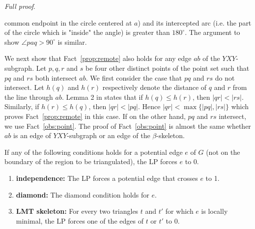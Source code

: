 \documentclass[final]{siamltex}
\newcommand{\dg}{^{\circ}}
\newcommand{\edge}{e}
\newcommand{\graph}{G}
\newcommand{\tri}{t}  \newcommand{\vertex}{v}
\newcommand{\YXY}{YXY\xspace}
\newenvironment{fullproof}{\par{\it Full proof}. \ignorespaces}{\endproof}
\begin{document}
\begin{fullproof}
\begin{window}
common endpoint in the circle centered at $a$) and its intercepted arc (i.e. the part of the circle 
which is "inside" the angle) is greater than $180\dg$. The argument to show $\angle p a q > 90\dg$
is similar.
\end{window}
We next show that Fact~\ref{prop:remote} 
also holds for any edge $a b$ of the $\YXY$-subgraph.
Let $p,q,r$ and $s$ be four other distinct points of the point set 
such that $p q$ and $r s$ both intersect $a b$.
We first consider the case that $p q$ and $r s$ do not intersect.
Let $h(q)$ and $h(r)$ respectively denote the distance of $q$ and $r$ from the line through $a b$. 
Lemma 2 in \cite{yang1994chain} states that if $h(q)\le h(r)$, then $|q r|<|r s|$. 
Similarly, if $h(r)\le h(q)$, then $|q r|<|p q|$. Hence $|q r| < \max\{|p q|, |r s|\}$
which proves Fact~\ref{prop:remote} in this case. 
If on the other hand, $p q$ and $r s$ intersect, we use Fact~\ref{obs:point}. The proof of 
Fact~\ref{obs:point} is almost the same whether $a b$ is an edge of $\YXY$-subgraph or an edge of
the $\beta$-skeleton.
\end{fullproof}



\begin{lemma}\label{lemma:out}
  If any of the following conditions holds for a potential edge $\edge$ of $\graph$ 
  (not on the boundary of the region to be triangulated),
  the LP forces $\edge$ to 0.
  \begin{enumerate}
  \item \label{out:independence} {\bf independence:}
    The LP forces a potential edge that crosses $\edge$ to 1.  
\item \label{out:diamond}
    {\bf diamond:} The diamond condition holds for $\edge$.
\item \label{out:LMT} {\bf LMT skeleton:}
    For every two triangles $\tri$ and $\tri'$ for which $\edge$ is locally minimal,
    the LP forces one of the edges of $\tri$ or $\tri'$ to 0.
 \end{enumerate}
\end{lemma}
\end{document}
